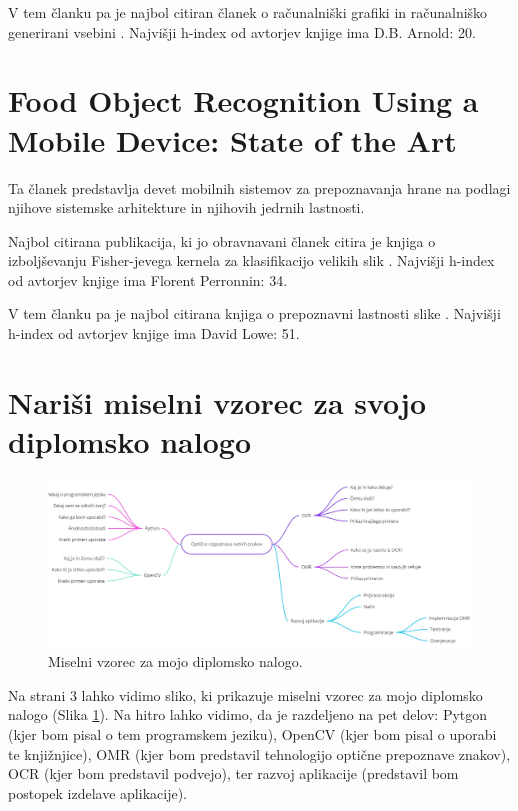 \documentclass[11pt,a4paper]{article}
\begin{document}
V tem članku pa je najbol citiran članek o računalniški grafiki in računalniško generirani vsebini \cite{cgm}. Najvišji h-index od avtorjev knjige ima D.B. Arnold: 20.


\section{Food Object Recognition Using a Mobile Device: State of the Art}

Ta članek \cite{article2} predstavlja devet mobilnih sistemov za prepoznavanja hrane na podlagi njihove sistemske arhitekture in njihovih jedrnih lastnosti.

Najbol citirana publikacija, ki jo obravnavani članek citira je knjiga o izboljševanju Fisher-jevega kernela za klasifikacijo velikih slik \cite{improving}. Najvišji h-index od avtorjev knjige ima Florent Perronnin: 34.

V tem članku pa je najbol citirana knjiga o prepoznavni lastnosti slike \cite{distinctive}. Najvišji h-index od avtorjev knjige ima David Lowe: 51.


\section{Nariši miselni vzorec za svojo diplomsko nalogo}

\begin{figure}[p]
\centerline{\includegraphics[scale=0.45, angle=90]{mindmap.png}}
\caption{Miselni vzorec za mojo diplomsko nalogo.}
\label{sl:mindmap}
\end{figure}

Na strani 3 lahko vidimo sliko, ki prikazuje miselni vzorec za mojo diplomsko nalogo (Slika \ref{sl:mindmap}). Na hitro lahko vidimo, da je razdeljeno na pet delov: Pytgon (kjer bom pisal o tem programskem jeziku), OpenCV (kjer bom pisal o uporabi te knjižnjice), OMR (kjer bom predstavil tehnologijo optične prepoznave znakov), OCR (kjer bom predstavil podvejo), ter razvoj aplikacije (predstavil bom postopek izdelave aplikacije).





\end{document}
